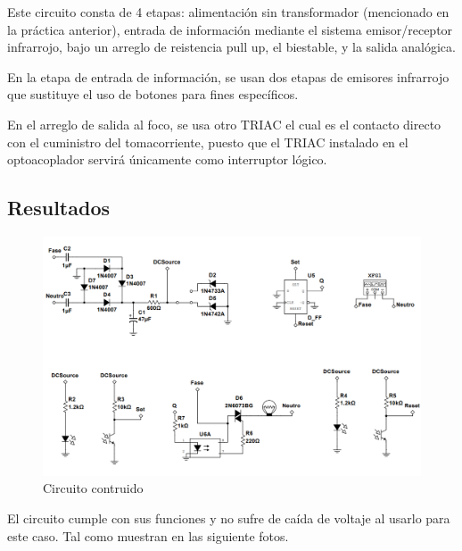 Este circuito consta de 4 etapas: alimentación sin transformador (mencionado en la práctica anterior), entrada de información
mediante el sistema emisor/receptor infrarrojo, bajo un arreglo de reistencia pull up, el biestable, y la salida analógica.

En la etapa de entrada de información, se usan dos etapas de emisores infrarrojo que sustituye el uso de botones para 
fines específicos.

En el arreglo de salida al foco, se usa otro TRIAC el cual es el contacto directo con el cuministro del tomacorriente, puesto
que el TRIAC instalado en el optoacoplador servirá únicamente como interruptor lógico.


\subsection{Resultados}

\begin{figure}[h]
    \centering
    \includegraphics[scale=0.4]{media/Circuito.png}
    \caption{Circuito contruido}
    \label{Fig: Circuito contruido}
\end{figure}

El circuito cumple con sus funciones y no sufre de caída de voltaje al usarlo para este caso. Tal como muestran en las 
siguiente fotos.

